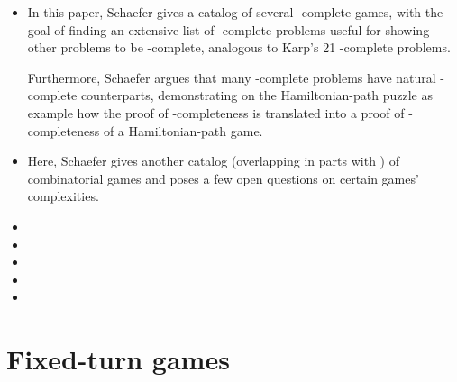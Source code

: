 \begin{itemize}
  \item {}

    \begin{annotation}
      In this paper, Schaefer gives a catalog of several \PSPACE-complete
      games, with the goal of finding an extensive list of \PSPACE-complete
      problems useful for showing other problems to be \PSPACE-complete,
      analogous to Karp's 21 \NP-complete problems.

      Furthermore, Schaefer argues that many \NP-complete problems have natural
      \PSPACE-complete counterparts, demonstrating on the Hamiltonian-path
      puzzle as example how the proof of \NP-completeness is translated into a
      proof of \PSPACE-completeness of a Hamiltonian-path game.
    \end{annotation}

  \item {}

    \begin{annotation}
      Here, Schaefer gives another catalog (overlapping in parts with
      \textcite{schaefer.deriving}) of combinatorial games and poses a few open
      questions on certain games' complexities.
    \end{annotation}

  \item {}
  \item {}
  \item {}
  \item {}
  \item {}
\end{itemize}

\section{Fixed-turn games}


